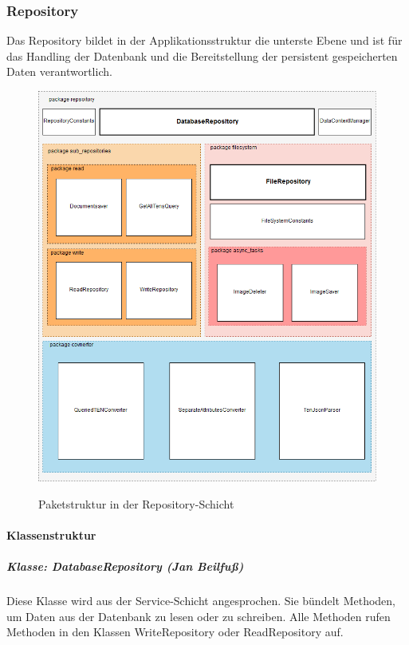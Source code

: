 \subsubsection{Repository}
Das Repository bildet in der Applikationsstruktur die unterste Ebene und ist für das Handling der Datenbank und die Bereitstellung der persistent gespeicherten Daten verantwortlich.

\begin{figure}[H]
\centering
\begin{minipage}[t]{1\textwidth} %
\caption{Paketstruktur in der Repository-Schicht} %
\includegraphics[width=1 \textwidth]{img/RepositoryPackages}\\ %
\end{minipage}
\end{figure}

\paragraph{Klassenstruktur}

\subparagraph{Klasse: DatabaseRepository (Jan Beilfuß)}
Diese Klasse wird aus der Service-Schicht angesprochen. Sie bündelt Methoden, um Daten aus der Datenbank zu lesen oder zu schreiben. Alle Methoden rufen Methoden in den Klassen WriteRepository oder ReadRepository auf.

